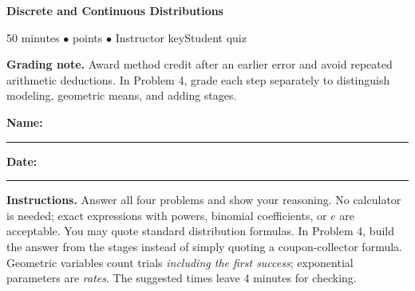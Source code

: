 \documentclass[11pt,letterpaper]{article}
\newcommand{\edition}{\ifanswers Instructor key\else Student quiz\fi}
\begin{document}
{\LARGE\bfseries\color{indigo}Discrete and Continuous Distributions}\par
{\small\color{muted}50 minutes \quad $\bullet$  points
  \quad $\bullet$ \quad \edition}\par
\ifanswers
  \textbf{Grading note.} Award method credit after an earlier error and
  avoid repeated arithmetic deductions. In Problem 4, grade each step
  separately to distinguish modeling, geometric means, and adding stages.\par
\else
  \smallskip
  \textbf{Name:}\ \rule{.49\linewidth}{.4pt}\hfill
  \textbf{Date:}\ \rule{.20\linewidth}{.4pt}\par
\fi
\textbf{Instructions.} Answer all four problems and show your reasoning.
No calculator is needed; exact expressions with powers, binomial
coefficients, or $e$ are acceptable. You may quote standard distribution
formulas. In Problem 4, build the answer from the stages instead of simply
quoting a coupon-collector formula. Geometric variables count trials
\emph{including the first success}; exponential parameters are \emph{rates}.
The suggested times leave 4 minutes for checking.
\end{document}
